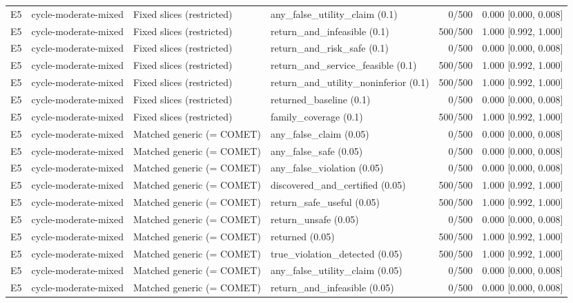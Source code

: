\begin{longtable}{p{.04\linewidth}p{.18\linewidth}p{.19\linewidth}p{.16\linewidth}r p{.21\linewidth}}
E5 & cycle-moderate-mixed & Fixed slices (restricted) & any\_false\_utility\_claim (0.1) & 0/500 & 0.000 [0.000, 0.008]\\
E5 & cycle-moderate-mixed & Fixed slices (restricted) & return\_and\_infeasible (0.1) & 500/500 & 1.000 [0.992, 1.000]\\
E5 & cycle-moderate-mixed & Fixed slices (restricted) & return\_and\_risk\_safe (0.1) & 0/500 & 0.000 [0.000, 0.008]\\
E5 & cycle-moderate-mixed & Fixed slices (restricted) & return\_and\_service\_feasible (0.1) & 500/500 & 1.000 [0.992, 1.000]\\
E5 & cycle-moderate-mixed & Fixed slices (restricted) & return\_and\_utility\_noninferior (0.1) & 500/500 & 1.000 [0.992, 1.000]\\
E5 & cycle-moderate-mixed & Fixed slices (restricted) & returned\_baseline (0.1) & 0/500 & 0.000 [0.000, 0.008]\\
E5 & cycle-moderate-mixed & Fixed slices (restricted) & family\_coverage (0.1) & 500/500 & 1.000 [0.992, 1.000]\\
E5 & cycle-moderate-mixed & Matched generic (= COMET) & any\_false\_claim (0.05) & 0/500 & 0.000 [0.000, 0.008]\\
E5 & cycle-moderate-mixed & Matched generic (= COMET) & any\_false\_safe (0.05) & 0/500 & 0.000 [0.000, 0.008]\\
E5 & cycle-moderate-mixed & Matched generic (= COMET) & any\_false\_violation (0.05) & 0/500 & 0.000 [0.000, 0.008]\\
E5 & cycle-moderate-mixed & Matched generic (= COMET) & discovered\_and\_certified (0.05) & 500/500 & 1.000 [0.992, 1.000]\\
E5 & cycle-moderate-mixed & Matched generic (= COMET) & return\_safe\_useful (0.05) & 500/500 & 1.000 [0.992, 1.000]\\
E5 & cycle-moderate-mixed & Matched generic (= COMET) & return\_unsafe (0.05) & 0/500 & 0.000 [0.000, 0.008]\\
E5 & cycle-moderate-mixed & Matched generic (= COMET) & returned (0.05) & 500/500 & 1.000 [0.992, 1.000]\\
E5 & cycle-moderate-mixed & Matched generic (= COMET) & true\_violation\_detected (0.05) & 500/500 & 1.000 [0.992, 1.000]\\
E5 & cycle-moderate-mixed & Matched generic (= COMET) & any\_false\_utility\_claim (0.05) & 0/500 & 0.000 [0.000, 0.008]\\
E5 & cycle-moderate-mixed & Matched generic (= COMET) & return\_and\_infeasible (0.05) & 0/500 & 0.000 [0.000, 0.008]\\

\end{longtable}
